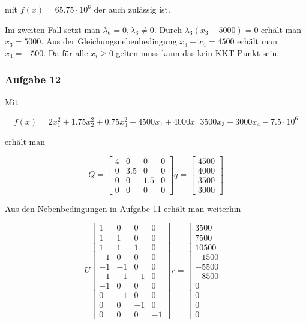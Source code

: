\documentclass[a4paper, 12pt]{report}
\begin{document}
mit $f(x) = 65.75 \cdot 10^6$ der auch zulässig ist.\par

Im zweiten Fall setzt man $\lambda_6 = 0, \lambda_3 \neq 0$. Durch $\lambda_3(x_3 - 5000) = 0$ erhält man $x_3 = 5000$. Aus der
Gleichungsnebenbedingung $x_3 + x_4 = 4500$ erhält man $x_4 = -500$. Da für alle $x_i \geq 0$ gelten muss kann das kein KKT-Punkt
sein.

\subsubsection{Aufgabe 12}
Mit

$$ f(x) = 2x_1^2 + 1.75x_2^2 + 0.75x_3^2 + 4500x_1 + 4000x_ + 3500x_3 + 3000x_4 - 7.5\cdot 10^6 $$

erhält man

$$ Q = \begin{bmatrix}4 & 0 & 0 & 0\\0 & 3.5 & 0 & 0\\0 & 0 & 1.5 & 0\\0 & 0 & 0 & 0\end{bmatrix} q = \begin{bmatrix}4500\\4000\\3500\\3000\end{bmatrix} $$

Aus den Nebenbedingungen in Aufgabe 11 erhält man weiterhin

$$ U \begin{bmatrix}1 & 0 & 0 & 0\\1 & 1 & 0 & 0\\1 & 1 & 1 & 0\\-1 & 0 & 0 & 0\\-1 & -1 & 0 & 0\\-1 & -1 & -1 & 0\\-1 & 0 & 0 & 0\\0 & -1 & 0 & 0\\0 & 0 & -1 & 0\\0 & 0 & 0 & -1\end{bmatrix} r = \begin{bmatrix}3500\\7500\\10500\\-1500\\-5500\\-8500\\0\\0\\0\\0\end{bmatrix} $$
\end{document}

